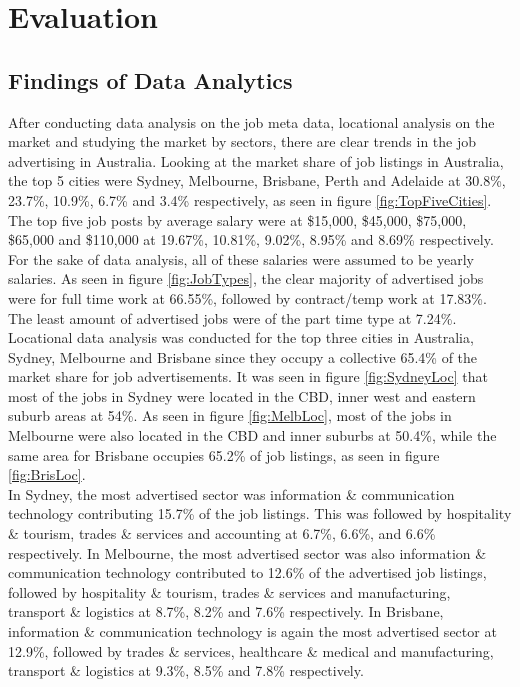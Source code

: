 \documentclass[twoside, 12pt, a4paper]{article}
\begin{document}
\newpage
\section{Evaluation}
\subsection{Findings of Data Analytics}
After conducting data analysis on the job meta data, locational analysis on the market and studying the market by sectors, there are clear trends in the job advertising in Australia. Looking at the market share of job listings in Australia, the top 5 cities were Sydney, Melbourne, Brisbane, Perth and Adelaide at 30.8\%, 23.7\%, 10.9\%, 6.7\% and 3.4\% respectively, as seen in figure \ref{fig:TopFiveCities}. The top five job posts by average salary were at \$15,000, \$45,000, \$75,000, \$65,000 and \$110,000 at 19.67\%, 10.81\%, 9.02\%, 8.95\% and 8.69\% respectively. For the sake of data analysis, all of these salaries were assumed to be yearly salaries. As seen in figure \ref{fig:JobTypes}, the clear majority of advertised jobs were for full time work at 66.55\%, followed by contract/temp work at 17.83\%. The least amount of advertised jobs were of the part time type at 7.24\%.\\
Locational data analysis was conducted for the top three cities in Australia, Sydney, Melbourne and Brisbane since they occupy a collective 65.4\% of the market share for job advertisements. It was seen in figure \ref{fig:SydneyLoc} that most of the jobs in Sydney were located in the CBD, inner west and eastern suburb areas at 54\%. As seen in figure \ref{fig:MelbLoc}, most of the jobs in Melbourne were also located in the CBD and inner suburbs at 50.4\%, while the same area for Brisbane occupies 65.2\% of job listings, as seen in figure \ref{fig:BrisLoc}.\\
In Sydney, the most advertised sector was information \& communication technology contributing 15.7\% of the job listings. This was followed by hospitality \& tourism, trades \& services and accounting at 6.7\%, 6.6\%, and 6.6\% respectively. In Melbourne, the most advertised sector was also information \& communication technology contributed to 12.6\% of the advertised job listings, followed by hospitality \& tourism, trades \& services and manufacturing, transport \& logistics at 8.7\%, 8.2\% and 7.6\% respectively. In Brisbane, information \& communication technology is again the most advertised sector at 12.9\%, followed by trades \& services, healthcare \& medical and manufacturing, transport \& logistics at 9.3\%, 8.5\% and 7.8\% respectively.\\
\end{document}
